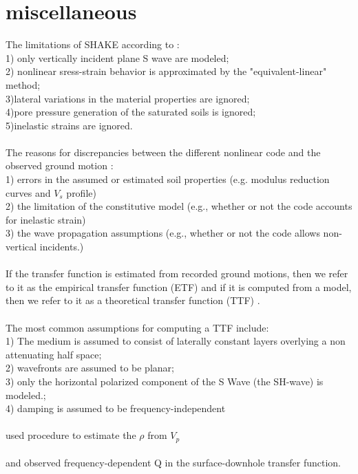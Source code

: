 \newpage
\section{miscellaneous}
\noindent
The limitations of SHAKE according to \citet{Thompson2012}:\\
1) only vertically incident plane S wave are modeled;\\
2) nonlinear sress-strain behavior is approximated by the "equivalent-linear" method;\\
3)lateral variations in the material properties are ignored;\\
4)pore pressure generation of the saturated soils is ignored;\\
5)inelastic strains are ignored.\\
\\
The reasons for discrepancies between the different nonlinear code and the observed ground motion \citep{Thompson2012}:\\
1) errors in the assumed or estimated soil properties (e.g. modulus reduction curves and $V_s$ profile)\\
2) the limitation of the constitutive model (e.g., whether or not the code accounts for inelastic strain)\\
3) the wave propagation assumptions (e.g., whether or not the code allows non-vertical incidents.)\\
\\
If the transfer function is estimated from recorded ground motions, then we refer to it as the empirical transfer function (ETF) and if it is computed from a model, then we refer to it as a theoretical transfer function (TTF) \citep{Thompson2012}.\\
\\
The most common assumptions for computing a TTF include:\\
1) The medium is assumed to consist of laterally constant layers overlying a non attenuating half space;\\
2) wavefronts are assumed to be planar;\\
3) only the horizontal polarized component of the S Wave (the SH-wave) is modeled.;\\
4) damping is assumed to be frequency-independent \\
\\
\citet{Thompson2012} used \citet{Boore2007} procedure to estimate the $\rho$ from $V_p$\\
\\
\citet{Blakeslee1991} and \citet{Fukushima1992} observed frequency-dependent Q in the surface-downhole transfer function. \\
